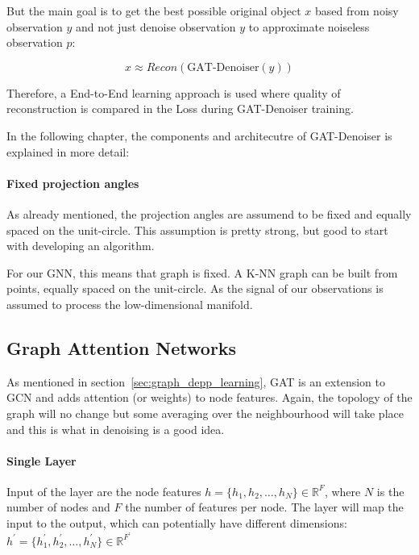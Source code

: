 But the main goal is to get the best possible original object $x$ based from noisy observation $y$ and not just denoise observation $y$ to approximate 
noiseless observation $p$:

\begin{equation}
  x \approx   Recon \left( \text{GAT-Denoiser} \left( y \right) \right)
\end{equation}

Therefore, a End-to-End learning approach is used where quality of reconstruction is 
compared in the Loss during GAT-Denoiser training.

In the following chapter, the components and architecutre of GAT-Denoiser is explained in more detail:

\paragraph{Fixed projection angles}
As already mentioned, the projection angles are assumend to be fixed and equally spaced on the unit-circle.
This assumption is pretty strong, but good to start with developing an algorithm.

\begin{tcolorbox}[colback=red!5!white,colframe=red!75!black]
  For our GNN, this means that graph is fixed. A K-NN graph can be built from points, equally spaced on the unit-circle.
  As the signal of our observations is assumed to process the low-dimensional manifold.
\end{tcolorbox}



\subsection{Graph Attention Networks}
As mentioned in section~\ref{sec:graph_depp_learning}, GAT is an extension to GCN and 
adds attention (or weights) to node features. Again, the topology of the graph will no
change but some averaging over the neighbourhood will take place and this is what 
in denoising is a good idea.

\paragraph{Single Layer}
Input of the layer are the node features $h = \{ h_1, h_2, \dots , h_N \} \in \mathbb{R}^F$, 
where $N$ is the number of nodes and $F$ the number of features per node. 
The layer will map the input to the output, which can potentially have different dimensions: 
$h^{\prime} = \{ h_1^{\prime}, h_2^{\prime}, \dots, h_N^{\prime} \} \in \mathbb{R}^{F^{\prime}} $

